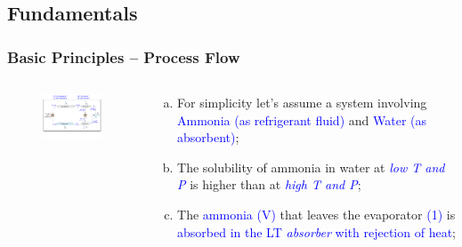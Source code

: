 \documentclass[10pt,compress]{beamer}
\begin{document}
\subsection{Fundamentals}
\begin{frame}
 \frametitle{Basic Principles -- Process Flow} 
  \begin{columns}
   \begin{column}[c]{0.45\linewidth}
    \begin{figure}%
     \includegraphics[width=5.5cm,clip]{./Pics/Overview_Refrig32}
    \end{figure}  
   \end{column}  
   \begin{column}[c]{0.55\linewidth}
    \begin{enumerate}[(a)]
     \item <1-> For simplicity let's assume a system involving \textcolor{blue}{Ammonia (as refrigerant fluid)} and \textcolor{blue}{Water (as absorbent)};
     \item <2-> The solubility of ammonia in water at \textcolor{blue}{{\it low T and P}} is higher than at \textcolor{blue}{{\it high T and P}};
     \item <3-> The \textcolor{blue}{ammonia (V)} that leaves the evaporator \textcolor{blue}{(1)} is \textcolor{blue}{absorbed in the LT {\it absorber} with rejection of heat};
   \end{enumerate}
  \end{column}  
 \end{columns}  
\end{frame}
\end{document}
